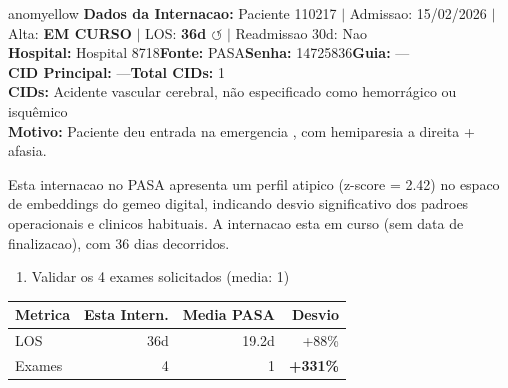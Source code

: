 \documentclass[a4paper,10pt]{article}
\begin{document}
\begin{anomalycard}[Internacao 183637 | PASA | MODERADO (z=2.42)]{anomyellow}
\textbf{Dados da Internacao:} Paciente 110217 $\mid$ Admissao: 15/02/2026 $\mid$ Alta: \textcolor{anomorange}{\textbf{EM CURSO}} $\mid$ LOS: \textbf{36d \textcolor{anomorange}{$\circlearrowleft$}} $\mid$ Readmissao 30d: Nao\\
\textbf{Hospital:} Hospital 8718\quad\textbf{Fonte:} PASA\quad\textbf{Senha:} 14725836\quad\textbf{Guia:} ---\\
\textbf{CID Principal:} {\small ---}\quad\textbf{Total CIDs:} 1\\

\textbf{CIDs:} {\scriptsize Acidente vascular cerebral, não especificado como hemorrágico ou isquêmico}\\

\textbf{Motivo:} {\scriptsize Paciente deu entrada na emergencia , com hemiparesia a direita + afasia.}\\

\vspace{2pt}\begin{tcolorbox}[colback=severityred!20,colframe=anomyellow,title={\textbf{Interpretacao de Negocio}},fonttitle=\bfseries\small,left=4pt,right=4pt,top=3pt,bottom=3pt]
{\small Esta internacao no PASA apresenta um perfil atipico (z-score = 2.42) no espaco de embeddings do gemeo digital, indicando desvio significativo dos padroes operacionais e clinicos habituais. A internacao esta em curso (sem data de finalizacao), com 36 dias decorridos.}
\end{tcolorbox}
\begin{tcolorbox}[colback=severityyellow!30,colframe=anomorange,title={\textbf{Recomendacoes Especificas}},fonttitle=\bfseries\small,left=4pt,right=4pt,top=3pt,bottom=3pt]
\begin{enumerate}[nosep,leftmargin=16pt]
\item {\small Validar os 4 exames solicitados (media: 1)}
\end{enumerate}
\end{tcolorbox}
\begin{center}\begin{tabular}{l r r r}\toprule\textbf{Metrica} & \textbf{Esta Intern.} & \textbf{Media PASA} & \textbf{Desvio} \\\midrule
LOS & 36d & 19.2d & \textcolor{anomorange}{+88\%} \\
Exames & 4 & 1 & \textcolor{anomred}{\textbf{+331\%}} \\
\bottomrule\end{tabular}\end{center}


\end{anomalycard}
\end{document}
